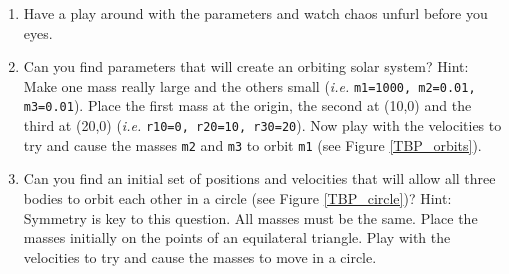 \documentclass[10pt]{article}
\newcommand{\see}[1]{(see Figure \ref{#1})}
\newcommand{\ie}{\emph{i.e.} }
\begin{document}
\begin{enumerate}
\item Have a play around with the parameters and watch chaos unfurl before you eyes.
\item Can you find parameters that will create an orbiting solar system? Hint: Make one mass really large and the others small (\ie \texttt{m1=1000, m2=0.01, m3=0.01}). Place the first mass at the origin, the second at (10,0) and the third at (20,0) (\ie \texttt{r10=0, r20=10, r30=20}). Now play with the velocities to try and cause the masses \texttt{m2} and \texttt{m3} to orbit \texttt{m1} \see{TBP_orbits}.
\item Can you find an initial set of positions and velocities that will allow all three bodies to orbit each other in a circle \see{TBP_circle}?
Hint: Symmetry is key to this question. All masses must be the same. Place the masses initially on the points of an equilateral triangle. Play with the velocities to try and cause the masses to move in a circle.
\end{enumerate}
\end{document}
